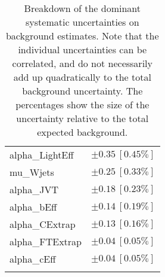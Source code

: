 \begin{table}
\begin{center}
\begin{tabular*}{\textwidth}{@{\extracolsep{\fill}}lc}
alpha\_LightEff         & $\pm 0.35\ [0.45\%] $       \\
mu\_Wjets         & $\pm 0.25\ [0.33\%] $       \\
alpha\_JVT         & $\pm 0.18\ [0.23\%] $       \\
alpha\_bEff         & $\pm 0.14\ [0.19\%] $       \\
alpha\_CExtrap         & $\pm 0.13\ [0.16\%] $       \\
alpha\_FTExtrap         & $\pm 0.04\ [0.05\%] $       \\
alpha\_cEff         & $\pm 0.04\ [0.05\%] $       \\
\noalign{\smallskip}\hline\noalign{\smallskip}
\end{tabular*}
\end{center}
\caption[Breakdown of uncertainty on background estimates]{
Breakdown of the dominant systematic uncertainties on background estimates.
Note that the individual uncertainties can be correlated, and do not necessarily add up quadratically to 
the total background uncertainty. The percentages show the size of the uncertainty relative to the total expected background.
\label{table.results.bkgestimate.uncertainties.VRTopATT}}
\end{table}
%